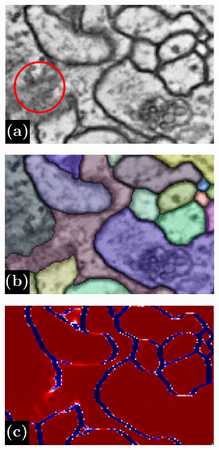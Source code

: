 \begin{figure}[t]
\begin{subfigure}[t]{0.32\linewidth}
\centering
\includegraphics[width=0.99\linewidth,trim=0in 0in 0in 0.2in,clip]{./figures/LSIMasks/aff_compare_designer/raw.pdf} %
\end{subfigure}
\begin{subfigure}[t]{0.32\linewidth}
\centering
\includegraphics[width=0.99\linewidth,trim=0in 0in 0in 0.2in,clip]{./figures/LSIMasks/aff_compare_designer/GT.pdf} %
\end{subfigure}
\begin{subfigure}[t]{0.32\linewidth}
\centering
\includegraphics[width=0.99\linewidth,trim=0in 0in 0in 0.2in,clip]{./figures/LSIMasks/aff_compare_designer/dice_2.pdf} %

\end{subfigure}
\end{figure}

